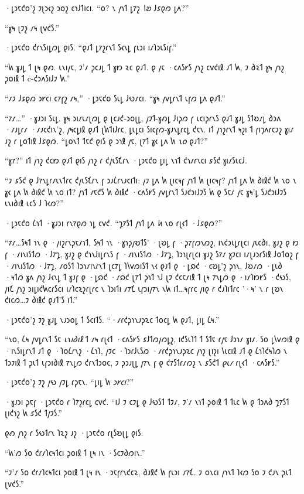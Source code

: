 ·𐑛𐑮𐑱𐑒𐑴'𐑟 𐑲𐑚𐑮𐑬𐑟 𐑮𐑴𐑟 𐑤𐑪𐑓𐑑𐑦𐑤𐑦. “𐑴? 𐑯 𐑢𐑪𐑑 𐑛𐑳𐑟 \emph{𐑘𐑹} 𐑓𐑭𐑞𐑼 𐑛𐑵?”

“𐑣𐑰 𐑚𐑲𐑟 𐑥𐑰 𐑚𐑫𐑒𐑕.”

·𐑛𐑮𐑱𐑒𐑴 𐑒𐑩𐑯𐑕𐑦𐑛𐑼𐑛 𐑞𐑦𐑕. “𐑞𐑨𐑑 𐑛𐑳𐑟𐑩𐑯𐑑 𐑕𐑬𐑯𐑛 𐑝𐑧𐑮𐑦 𐑦𐑥𐑐𐑮𐑧𐑕𐑦𐑝.”

“𐑿 𐑣𐑨𐑛 𐑑 𐑚𐑰 𐑞𐑺. 𐑧𐑯𐑦𐑢𐑱, 𐑲'𐑥 𐑜𐑤𐑨𐑛 𐑑 𐑣𐑽 𐑷𐑤 𐑞𐑨𐑑. 𐑞 𐑢𐑱 ·𐑤𐑵𐑕𐑾𐑕 𐑢𐑪𐑟 𐑤𐑫𐑒𐑦𐑙 𐑨𐑑 𐑿, 𐑲 𐑔𐑷𐑑 𐑣𐑰 𐑢𐑪𐑟 𐑜𐑴𐑦𐑙 𐑑 c-𐑒𐑮𐑵𐑕𐑦𐑓𐑲 𐑿.”

“𐑥𐑲 𐑓𐑭𐑞𐑼 𐑮𐑾𐑤𐑦 𐑤𐑳𐑝𐑟 𐑥𐑰,” ·𐑛𐑮𐑱𐑒𐑴 𐑕𐑧𐑛 𐑓𐑻𐑥𐑤𐑦. “𐑣𐑰 𐑢𐑫𐑛𐑩𐑯𐑑 𐑧𐑝𐑼 𐑛𐑵 𐑞𐑨𐑑.”

“𐑳𐑥…” ·𐑣𐑨𐑮𐑦 𐑕𐑧𐑛. 𐑣𐑰 𐑮𐑦𐑥𐑧𐑥𐑚𐑼𐑛 𐑞 𐑚𐑤𐑨𐑒-𐑮𐑴𐑚𐑛, 𐑢𐑲𐑑-𐑣𐑺𐑛 𐑓𐑦𐑜𐑼 𐑝 𐑧𐑤𐑦𐑜𐑩𐑯𐑕 𐑞𐑨𐑑 𐑣𐑨𐑛 𐑕𐑑𐑹𐑥𐑛 𐑔𐑮𐑵 ·𐑥𐑨𐑛𐑩𐑥 ·𐑥𐑨𐑤𐑒𐑦𐑯'𐑟, 𐑢𐑰𐑤𐑛𐑦𐑙 𐑞𐑨𐑑 𐑚𐑿𐑑𐑦𐑓𐑩𐑤, 𐑛𐑧𐑛𐑤𐑦 𐑕𐑦𐑤𐑝𐑼-𐑣𐑨𐑯𐑛𐑩𐑤𐑛 𐑒𐑱𐑯. 𐑦𐑑 𐑢𐑪𐑟𐑩𐑯𐑑 𐑰𐑟𐑦 𐑑 𐑝𐑦𐑠𐑵𐑩𐑤𐑲𐑟 𐑣𐑦𐑥 𐑨𐑟 𐑩 𐑛𐑴𐑑𐑦𐑙 𐑓𐑭𐑞𐑼. “𐑛𐑴𐑯𐑑 𐑑𐑱𐑒 𐑞𐑦𐑕 𐑞 𐑮𐑪𐑙 𐑢𐑱, 𐑚𐑳𐑑 𐑣𐑬 𐑛𐑵 𐑿 \emph{𐑯𐑴} 𐑞𐑨𐑑?”

“𐑣𐑳?” 𐑦𐑑 𐑢𐑪𐑟 𐑒𐑤𐑽 𐑞𐑨𐑑 𐑞𐑦𐑕 𐑢𐑪𐑟 𐑩 𐑒𐑢𐑧𐑕𐑗𐑩𐑯 ·𐑛𐑮𐑱𐑒𐑴 𐑛𐑦𐑛 𐑯𐑪𐑑 𐑒𐑪𐑥𐑩𐑯𐑤𐑦 𐑭𐑕𐑒 𐑣𐑦𐑥𐑕𐑧𐑤𐑓.

“𐑲 𐑭𐑕𐑒 𐑞 𐑓𐑳𐑯𐑛𐑩𐑥𐑧𐑯𐑑𐑩𐑤 𐑒𐑢𐑧𐑕𐑗𐑩𐑯 𐑝 𐑮𐑨𐑖𐑩𐑯𐑨𐑤𐑦𐑑𐑦: 𐑢𐑲 𐑛𐑵 𐑿 𐑚𐑦𐑤𐑰𐑝 𐑢𐑪𐑑 𐑿 𐑚𐑦𐑤𐑰𐑝? 𐑢𐑪𐑑 𐑛𐑵 𐑿 𐑔𐑦𐑙𐑒 𐑿 𐑯𐑴 𐑯 𐑣𐑬 𐑛𐑵 𐑿 𐑔𐑦𐑙𐑒 𐑿 𐑯𐑴 𐑦𐑑? 𐑢𐑪𐑑 𐑥𐑱𐑒𐑕 𐑿 𐑔𐑦𐑙𐑒 ·𐑤𐑵𐑕𐑾𐑕 𐑢𐑫𐑛𐑩𐑯𐑑 𐑕𐑨𐑒𐑮𐑦𐑓𐑲𐑕 𐑿 𐑞 𐑕𐑱𐑥 𐑢𐑱 𐑣𐑰'𐑛 𐑕𐑨𐑒𐑮𐑦𐑓𐑲𐑕 𐑧𐑯𐑦𐑔𐑦𐑙 𐑧𐑤𐑕 𐑓 𐑐𐑬𐑼?”

·𐑛𐑮𐑱𐑒𐑴 𐑖𐑪𐑑 ·𐑣𐑨𐑮𐑦 𐑩𐑯𐑳𐑞𐑼 𐑪𐑛 𐑤𐑫𐑒. “𐑡𐑳𐑕𐑑 𐑢𐑪𐑑 𐑛𐑵 \emph{𐑿} 𐑯𐑴 𐑩𐑚𐑬𐑑 ·𐑓𐑭𐑞𐑼?”

“𐑳𐑥…𐑕𐑰𐑑 𐑪𐑯 𐑞 ·𐑢𐑦𐑟𐑩𐑯𐑜𐑱𐑥𐑪𐑑, 𐑕𐑰𐑑 𐑪𐑯 ·𐑣𐑪𐑜𐑢𐑹𐑑𐑕' ·𐑚𐑹𐑛 𐑝 ·𐑜𐑳𐑝𐑼𐑯𐑼𐑟, 𐑦𐑯𐑒𐑮𐑧𐑛𐑩𐑚𐑤𐑦 𐑢𐑧𐑤𐑔𐑦, 𐑣𐑨𐑟 𐑞 𐑽 𐑝 ·𐑥𐑦𐑯𐑦𐑕𐑑𐑼 ·𐑓𐑳𐑡, 𐑣𐑨𐑟 𐑞 𐑒𐑪𐑯𐑓𐑦𐑛𐑩𐑯𐑕 𐑝 ·𐑥𐑦𐑯𐑦𐑕𐑑𐑼 ·𐑓𐑳𐑡, 𐑐𐑮𐑪𐑚𐑩𐑚𐑤𐑦 𐑣𐑨𐑟 𐑕𐑳𐑥 𐑣𐑲𐑤𐑦 𐑦𐑥𐑚𐑨𐑮𐑩𐑕𐑦𐑙 𐑓𐑴𐑑𐑴𐑟 𐑝 ·𐑥𐑦𐑯𐑦𐑕𐑑𐑼 ·𐑓𐑳𐑡, 𐑥𐑴𐑕𐑑 𐑐𐑮𐑪𐑥𐑦𐑯𐑩𐑯𐑑 𐑚𐑤𐑳𐑛 𐑐𐑘𐑫𐑼𐑦𐑕𐑑 𐑯𐑬 𐑞𐑨𐑑 𐑞 ·𐑛𐑸𐑒 ·𐑤𐑹𐑛'𐑟 𐑜𐑪𐑯, 𐑓𐑹𐑥𐑼 ·𐑛𐑧𐑔 ·𐑰𐑑𐑼 𐑣𐑵 𐑢𐑪𐑟 𐑓𐑬𐑯𐑛 𐑑 𐑣𐑨𐑝 𐑞 ·𐑛𐑸𐑒 ·𐑥𐑸𐑒 𐑚𐑳𐑑 𐑜𐑪𐑑 𐑪𐑓 𐑚𐑲 𐑒𐑤𐑱𐑥𐑦𐑙 𐑑 𐑚𐑰 𐑳𐑯𐑛𐑼 𐑞 ·𐑦𐑥𐑐𐑽𐑾𐑕 ·𐑒𐑻𐑕, 𐑢𐑦𐑗 𐑢𐑪𐑟 𐑮𐑦𐑛𐑦𐑒𐑿𐑤𐑩𐑕𐑤𐑦 𐑦𐑥𐑐𐑤𐑷𐑟𐑩𐑚𐑩𐑤 𐑯 𐑐𐑮𐑦𐑑𐑦 𐑥𐑳𐑗 𐑧𐑝𐑮𐑦𐑢𐑳𐑯 𐑯𐑿 𐑦𐑑…𐑰𐑝𐑩𐑤 𐑢𐑦𐑞 𐑩 𐑒𐑨𐑐𐑦𐑑𐑩𐑤 '·𐑰' 𐑯 𐑩 𐑚𐑹𐑯 𐑒𐑦𐑤𐑼…𐑲 𐑔𐑦𐑙𐑒 𐑞𐑨𐑑'𐑕 𐑦𐑑.”

·𐑛𐑮𐑱𐑒𐑴'𐑟 𐑲𐑟 𐑣𐑨𐑛 𐑯𐑨𐑮𐑴𐑛 𐑑 𐑕𐑤𐑦𐑑𐑕. “·𐑥𐑩𐑒𐑜𐑪𐑯𐑨𐑜𐑷𐑤 𐑑𐑴𐑤𐑛 𐑿 𐑞𐑨𐑑, 𐑛𐑦𐑛 𐑖𐑰.”

“𐑯𐑴, 𐑖𐑰 𐑢𐑫𐑛𐑩𐑯𐑑 𐑕𐑱 \emph{𐑧𐑯𐑦𐑔𐑦𐑙} 𐑑 𐑥𐑰 𐑩𐑚𐑬𐑑 ·𐑤𐑵𐑕𐑾𐑕 𐑭𐑓𐑑𐑼𐑢𐑼𐑛𐑟, 𐑦𐑒𐑕𐑧𐑐𐑑 𐑑 𐑕𐑑𐑱 𐑩𐑢𐑱 𐑓𐑮𐑪𐑥 𐑣𐑦𐑥. 𐑕𐑴 𐑛𐑘𐑫𐑼𐑦𐑙 𐑞 ·𐑦𐑯𐑕𐑦𐑛𐑩𐑯𐑑 𐑨𐑑 𐑞 ·𐑐𐑴𐑖𐑩𐑯𐑟 ·𐑖𐑪𐑐, 𐑢𐑲𐑤 ·𐑐𐑮𐑩𐑓𐑧𐑕𐑼 ·𐑥𐑩𐑒𐑜𐑪𐑯𐑨𐑜𐑷𐑤 𐑢𐑪𐑟 𐑚𐑦𐑟𐑦 𐑘𐑧𐑤𐑦𐑙 𐑨𐑑 𐑞 𐑖𐑪𐑐𐑒𐑰𐑐𐑼 𐑯 𐑑𐑮𐑲𐑦𐑙 𐑑 𐑜𐑧𐑑 𐑧𐑝𐑮𐑦𐑔𐑦𐑙 𐑳𐑯𐑛𐑼 𐑒𐑩𐑯𐑑𐑮𐑴𐑤, 𐑲 𐑜𐑮𐑨𐑚𐑛 𐑢𐑳𐑯 𐑝 𐑞 𐑒𐑳𐑕𐑑𐑩𐑥𐑼𐑟 𐑯 𐑭𐑕𐑒𐑑 \emph{𐑞𐑧𐑥} 𐑩𐑚𐑬𐑑 ·𐑤𐑵𐑕𐑾𐑕.”

·𐑛𐑮𐑱𐑒𐑴'𐑟 𐑲𐑟 𐑢𐑻 𐑢𐑲𐑛 𐑩𐑜𐑱𐑯. “𐑛𐑦𐑛 𐑿 \emph{𐑮𐑾𐑤𐑦}?”

·𐑣𐑨𐑮𐑦 𐑜𐑱𐑝 ·𐑛𐑮𐑱𐑒𐑴 𐑩 𐑐𐑳𐑟𐑩𐑤𐑛 𐑤𐑫𐑒. “𐑦𐑓 𐑲 𐑤𐑲𐑛 𐑞 𐑓𐑻𐑕𐑑 𐑑𐑲𐑥, 𐑲'𐑥 𐑯𐑪𐑑 𐑜𐑴𐑦𐑙 𐑑 𐑑𐑧𐑤 𐑿 𐑞 𐑑𐑮𐑵𐑔 𐑡𐑳𐑕𐑑 𐑚𐑦𐑒𐑪𐑟 𐑿 𐑭𐑕𐑒 𐑑𐑢𐑲𐑕.”

𐑞𐑺 𐑢𐑪𐑟 𐑩 𐑕𐑻𐑑𐑩𐑯 𐑐𐑷𐑟 𐑨𐑟 ·𐑛𐑮𐑱𐑒𐑴 𐑩𐑚𐑕𐑹𐑚𐑛 𐑞𐑦𐑕.

“𐑿'𐑼 𐑕𐑴 𐑒𐑩𐑥𐑐𐑤𐑰𐑑𐑤𐑦 𐑜𐑴𐑦𐑙 𐑑 𐑚𐑰 𐑦𐑯 ·𐑕𐑤𐑲𐑔𐑼𐑦𐑯.”

“𐑲'𐑥 𐑕𐑴 𐑒𐑩𐑥𐑐𐑤𐑰𐑑𐑤𐑦 𐑜𐑴𐑦𐑙 𐑑 𐑚𐑰 𐑦𐑯 ·𐑮𐑱𐑝𐑩𐑯𐑒𐑤𐑷, 𐑔𐑨𐑙𐑒 𐑿 𐑝𐑧𐑮𐑦 𐑥𐑳𐑗. 𐑲 𐑴𐑯𐑤𐑦 𐑢𐑪𐑯𐑑 𐑐𐑬𐑼 𐑕𐑴 𐑲 𐑒𐑨𐑯 𐑜𐑧𐑑 𐑚𐑫𐑒𐑕.”

